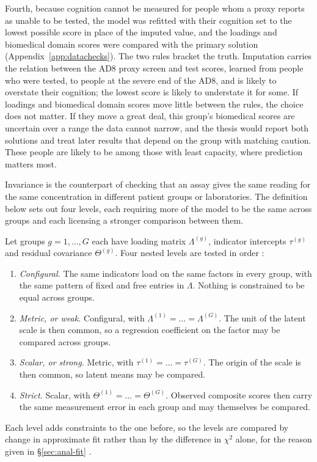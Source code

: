 Fourth, because cognition cannot be measured for people whom a proxy reports as unable to be tested, the model was refitted with their cognition set to the lowest possible score in place of the imputed value, and the loadings and biomedical domain scores were compared with the primary solution (Appendix~\ref{app:datachecks}). The two rules bracket the truth. Imputation carries the relation between the AD8 proxy screen and test scores, learned from people who were tested, to people at the severe end of the AD8, and is likely to overstate their cognition; the lowest score is likely to understate it for some. If loadings and biomedical domain scores move little between the rules, the choice does not matter. If they move a great deal, this group's biomedical scores are uncertain over a range the data cannot narrow, and the thesis would report both solutions and treat later results that depend on the group with matching caution. These people are likely to be among those with least capacity, where prediction matters most.

Invariance is the counterpart of checking that an assay gives the same reading for the same concentration in different patient groups or laboratories. The definition below sets out four levels, each requiring more of the model to be the same across groups and each licensing a stronger comparison between them.

\begin{definition}
\label{def:meas:invariance}
Let groups $g=1,\dots,G$ each have loading matrix $\Lambda^{(g)}$, indicator
intercepts $\tau^{(g)}$ and residual covariance $\Theta^{(g)}$. Four nested
levels are tested in order \citep{meredith_1993,putnick_bornstein_2016}:
\begin{enumerate}
  \item \emph{Configural.} The same indicators load on the same factors in
        every group, with the same pattern of fixed and free entries in
        $\Lambda$. Nothing is constrained to be equal across groups.
  \item \emph{Metric, or weak.} Configural, with
        $\Lambda^{(1)}=\dots=\Lambda^{(G)}$. The unit of the latent scale is
        then common, so a regression coefficient on the factor may be
        compared across groups.
  \item \emph{Scalar, or strong.} Metric, with
        $\tau^{(1)}=\dots=\tau^{(G)}$. The origin of the scale is then common,
        so latent means may be compared.
  \item \emph{Strict.} Scalar, with
        $\Theta^{(1)}=\dots=\Theta^{(G)}$. Observed composite scores then carry
        the same measurement error in each group and may themselves be
        compared.
\end{enumerate}
Each level adds constraints to the one before, so the levels are compared by
change in approximate fit rather than by the difference in $\chi^{2}$ alone,
for the reason given in \S\ref{sec:anal-fit} \citep{vandenberg_lance_2000}.
\end{definition}

